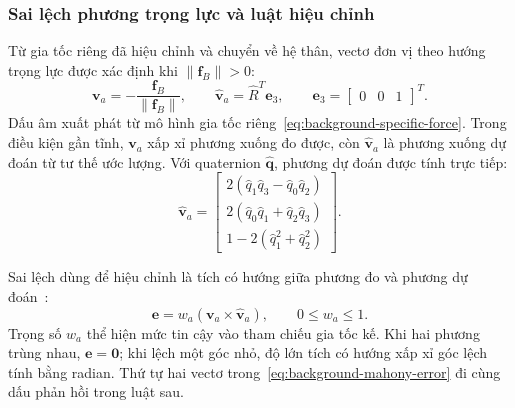 \subsubsection{Sai lệch phương trọng lực và luật hiệu chỉnh}

Từ gia tốc riêng đã hiệu chỉnh và chuyển về hệ thân, vectơ đơn vị theo hướng trọng lực được xác định khi $\|\mathbf f_B\|>0$:
\begin{equation}
    \mathbf v_a=-\frac{\mathbf f_B}{\|\mathbf f_B\|},
    \qquad
    \hat{\mathbf v}_a=\hat R^T\mathbf e_3,
    \qquad \mathbf e_3=\begin{bmatrix}0&0&1\end{bmatrix}^T.
    \label{eq:background-mahony-directions}
\end{equation}
Dấu âm xuất phát từ mô hình gia tốc riêng~\eqref{eq:background-specific-force}. Trong điều kiện gần tĩnh, $\mathbf v_a$ xấp xỉ phương xuống đo được, còn $\hat{\mathbf v}_a$ là phương xuống dự đoán từ tư thế ước lượng. Với quaternion $\hat{\mathbf q}$, phương dự đoán được tính trực tiếp:
\begin{equation}
    \hat{\mathbf v}_a=
    \begin{bmatrix}
        2(\hat q_1\hat q_3-\hat q_0\hat q_2)\\
        2(\hat q_0\hat q_1+\hat q_2\hat q_3)\\
        1-2(\hat q_1^2+\hat q_2^2)
    \end{bmatrix}.
    \label{eq:background-mahony-predicted-gravity}
\end{equation}

Sai lệch dùng để hiệu chỉnh là tích có hướng giữa phương đo và phương dự đoán~\cite{hamel2006attitude}:
\begin{equation}
    \mathbf e=w_a\left(\mathbf v_a\times\hat{\mathbf v}_a\right),
    \qquad 0\leq w_a\leq1.
    \label{eq:background-mahony-error}
\end{equation}
Trọng số $w_a$ thể hiện mức tin cậy vào tham chiếu gia tốc kế. Khi hai phương trùng nhau, $\mathbf e=\mathbf0$; khi lệch một góc nhỏ, độ lớn tích có hướng xấp xỉ góc lệch tính bằng radian. Thứ tự hai vectơ trong~\eqref{eq:background-mahony-error} đi cùng dấu phản hồi trong luật sau.

